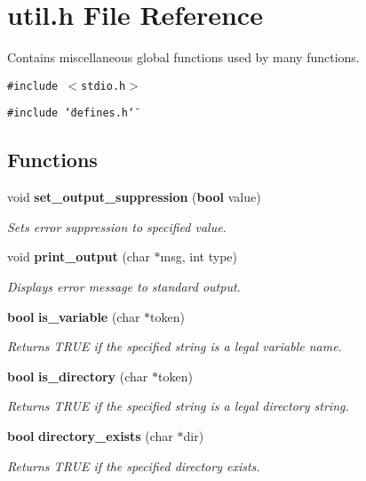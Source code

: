 \section{util.h File Reference}
\label{util_8h}
Contains miscellaneous global functions used by many functions. 


{\tt \#include $<$stdio.h$>$}\par
{\tt \#include \char`\"{}defines.h\char`\"{}}\par
\subsection*{Functions}
\begin{CompactItemize}
\item 
void {\bf set\_\-output\_\-suppression} ({\bf bool} value)
\begin{CompactList}\small\item\em Sets error suppression to specified value.\item\end{CompactList}\item 
void {\bf print\_\-output} (char $\ast$msg, int type)
\begin{CompactList}\small\item\em Displays error message to standard output.\item\end{CompactList}\item 
{\bf bool} {\bf is\_\-variable} (char $\ast$token)
\begin{CompactList}\small\item\em Returns TRUE if the specified string is a legal variable name.\item\end{CompactList}\item 
{\bf bool} {\bf is\_\-directory} (char $\ast$token)
\begin{CompactList}\small\item\em Returns TRUE if the specified string is a legal directory string.\item\end{CompactList}\item 
{\bf bool} {\bf directory\_\-exists} (char $\ast$dir)
\begin{CompactList}\small\item\em Returns TRUE if the specified directory exists.\item\end{CompactList}\item 

\end{CompactItemize}
